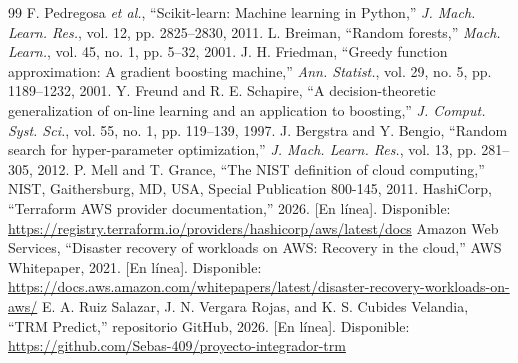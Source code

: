 \documentclass[conference]{IEEEtran}
\begin{document}
\begin{thebibliography}{99}
 F. Pedregosa \emph{et al.}, ``Scikit-learn: Machine learning in Python,'' \emph{J. Mach. Learn. Res.}, vol. 12, pp. 2825--2830, 2011.
 L. Breiman, ``Random forests,'' \emph{Mach. Learn.}, vol. 45, no. 1, pp. 5--32, 2001.
 J. H. Friedman, ``Greedy function approximation: A gradient boosting machine,'' \emph{Ann. Statist.}, vol. 29, no. 5, pp. 1189--1232, 2001.
 Y. Freund and R. E. Schapire, ``A decision-theoretic generalization of on-line learning and an application to boosting,'' \emph{J. Comput. Syst. Sci.}, vol. 55, no. 1, pp. 119--139, 1997.
 J. Bergstra and Y. Bengio, ``Random search for hyper-parameter optimization,'' \emph{J. Mach. Learn. Res.}, vol. 13, pp. 281--305, 2012.
 P. Mell and T. Grance, ``The NIST definition of cloud computing,'' NIST, Gaithersburg, MD, USA, Special Publication 800-145, 2011.
 HashiCorp, ``Terraform AWS provider documentation,'' 2026. [En línea]. Disponible: \url{https://registry.terraform.io/providers/hashicorp/aws/latest/docs}
 Amazon Web Services, ``Disaster recovery of workloads on AWS: Recovery in the cloud,'' AWS Whitepaper, 2021. [En línea]. Disponible: \url{https://docs.aws.amazon.com/whitepapers/latest/disaster-recovery-workloads-on-aws/}
 E. A. Ruiz Salazar, J. N. Vergara Rojas, and K. S. Cubides Velandia, ``TRM Predict,'' repositorio GitHub, 2026. [En línea]. Disponible: \url{https://github.com/Sebas-409/proyecto-integrador-trm}
\end{thebibliography}
\end{document}
